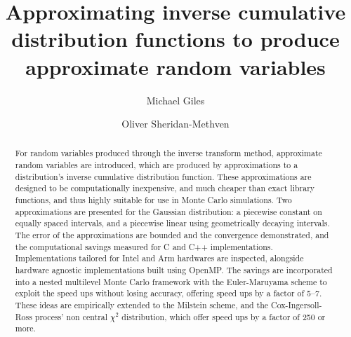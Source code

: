 \documentclass[manuscript,review]{acmart}
\title{Approximating inverse cumulative distribution functions to produce approximate random variables}
\author{Michael Giles}
\author{Oliver Sheridan-Methven}
\affiliation{%
\institution{Mathematical Institute, Oxford University}
\city{Oxford}
\country{UK}}
\begin{document}
\begin{abstract}
For random variables produced through the inverse transform method, approximate random variables are introduced, which are produced by approximations to a distribution's inverse cumulative distribution function. These approximations are designed to be computationally inexpensive, and much cheaper than exact library functions, and thus highly suitable for use in Monte Carlo simulations. Two approximations are presented for the Gaussian distribution: a piecewise constant on equally spaced intervals, and a piecewise linear using geometrically decaying intervals. The error of the approximations are bounded and the convergence demonstrated, and the computational savings measured for C and C++ implementations. Implementations tailored for Intel and Arm hardwares are inspected, alongside hardware agnostic implementations built using OpenMP. The savings are incorporated into a nested multilevel Monte Carlo framework with the Euler-Maruyama scheme to exploit the speed ups without losing accuracy, offering speed ups by a factor of 5--7. These ideas are empirically extended to the Milstein scheme, and the Cox-Ingersoll-Ross process' non central $ \chi^2 $ distribution, which offer speed ups by a factor of 250 or more.  
\end{abstract}
\end{document}

